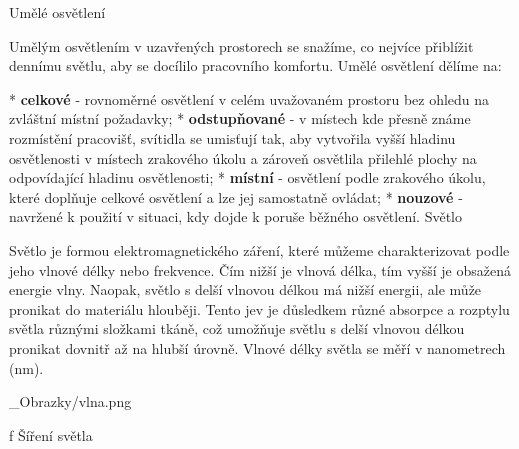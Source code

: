 \chap Umělé osvětlení

Umělým osvětlením v uzavřených prostorech se snažíme, co nejvíce přiblížit dennímu světlu, aby se docílilo pracovního komfortu. Umělé osvětlení dělíme na:

\medskip
\begitems
* {\bf celkové} - rovnoměrné osvětlení v celém uvažovaném prostoru bez ohledu na zvláštní místní požadavky;
* {\bf odstupňované} - v místech kde přesně známe rozmístění pracovišť, svítidla se umisťují tak, aby vytvořila
    vyšší hladinu osvětlenosti v místech zrakového úkolu a zároveň osvětlila přilehlé plochy na odpovídající hladinu osvětlenosti;
* {\bf místní} - osvětlení podle zrakového úkolu, které doplňuje celkové osvětlení a lze jej samostatně ovládat;
* {\bf nouzové}  - navržené k použití v situaci, kdy dojde k poruše běžného osvětlení.
\enditems
\sec Světlo


Světlo je formou elektromagnetického záření, které můžeme charakterizovat podle jeho vlnové délky nebo frekvence.
Čím nižší je vlnová délka, tím vyšší je obsažená energie vlny. Naopak, světlo s delší vlnovou délkou má nižší energii,
ale může pronikat do materiálu hlouběji. Tento jev je důsledkem různé absorpce a rozptylu světla různými složkami
tkáně, což umožňuje světlu s delší vlnovou délkou pronikat dovnitř až na hlubší úrovně.
Vlnové délky světla se měří v nanometrech (nm).

\medskip {}
\picw=10cm _Obrazky/vlna.png
\caption/f Šíření světla
\medskip



